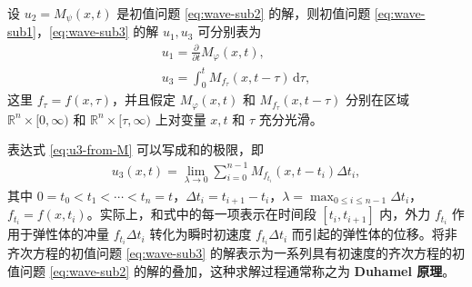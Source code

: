\documentclass[../../main.tex]{subfiles}%
\begin{document}
\begin{theorem}\label{theroem:PDE-定理4.1}
设 $u_2=M_\psi(x,t)$ 是初值问题 \eqref{eq:wave-sub2} 的解，则初值问题 \eqref{eq:wave-sub1}，\eqref{eq:wave-sub3} 的解 $u_1,u_3$ 可分别表为
\begin{gather}
u_1=\frac{\partial}{\partial t}M_\varphi(x,t), \label{eq:u1-from-M}
\\
u_3=\int_0^t M_{f_\tau}(x,t-\tau)\,\mathrm{d}\tau, \label{eq:u3-from-M}
\end{gather}
这里 $f_\tau=f(x,\tau)$，并且假定 $M_\varphi(x,t)$ 和 $M_{f_\tau}(x,t-\tau)$ 分别在区域 $\mathbb{R}^n\times[0,\infty)$ 和 $\mathbb{R}^n\times[\tau,\infty)$ 上对变量 $x,t$ 和 $\tau$ 充分光滑。
\end{theorem}
\begin{remark}
表达式 \eqref{eq:u3-from-M} 可以写成和的极限，即
\begin{align*}
u_3(x,t)=\lim_{\lambda\to 0}\sum_{i=0}^{n-1}M_{f_{t_i}}(x,t-t_i)\Delta t_i,
\end{align*}
其中 $0=t_0<t_1<\cdots<t_n=t$，$\Delta t_i=t_{i+1}-t_i$，$\lambda=\max_{0\leqslant i\leqslant n-1}\Delta t_i$，$f_{t_i}=f(x,t_i)$。实际上，和式中的每一项表示在时间段 $[t_i,t_{i+1}]$ 内，外力 $f_{t_i}$ 作用于弹性体的冲量 $f_{t_i}\Delta t_i$ 转化为瞬时初速度 $f_{t_i}\Delta t_i$ 而引起的弹性体的位移。将非齐次方程的初值问题 \eqref{eq:wave-sub3} 的解表示为一系列具有初速度的齐次方程的初值问题 \eqref{eq:wave-sub2} 的解的叠加，这种求解过程通常称之为 \textbf{Duhamel 原理}。
\end{remark}
\end{document}
